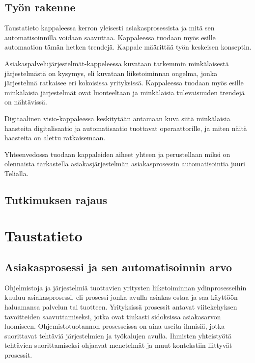 \documentclass[finnish,12pt,a4paper,pdftex]{article}
\begin{document}
\subsection{Työn rakenne}
Taustatieto kappaleessa kerron yleisesti asiakasprosessista ja mitä sen automatisoinnilla voidaan saavuttaa. Kappaleessa tuodaan myös esille automaation tämän hetken trendejä. Kappale määrittää työn keskeisen konseptin.

Asiakaspalvelujärjestelmät-kappeleessa kuvataan tarkemmin minkälaisestä järjestelmästä on kysymys, eli kuvataan liiketoiminnan ongelma, jonka järjestelmä ratkaisee eri kokoisissa yrityksissä. Kappaleessa tuodaan myös esille minkälaisia järjestelmät ovat luonteeltaan ja minkälaisia tulevaisuuden trendejä on nähtävissä.

Digitaalinen visio-kappaleessa keskitytään antamaan kuva siitä minkälaisia haasteita digitalisaatio ja automatisaatio tuottavat operaattorille, ja miten näitä haasteita on alettu ratkaisemaan.

Yhteenvedossa tuodaan kappaleiden aiheet yhteen ja perustellaan miksi on olennaista tarkastella asiakasjärjestelmän asiakasprosessin automatisointia juuri Telialla.

\subsection{Tutkimuksen rajaus}


\clearpage

\section{Taustatieto}



\subsection{Asiakasprosessi ja sen automatisoinnin arvo}

 Ohjelmistoja ja järjestelmiä tuottavien yritysten liiketoiminnan ydinprosesseihin kuuluu asiakasprosessi, eli prosessi jonka avulla asiakas ostaa ja saa käyttöön haluamansa palvelun tai tuotteen. Yrityksissä prosessit antavat viitekehyksen tavoitteiden saavuttamiseksi, jotka ovat tiukasti sidoksissa asiakasarvon luomiseen. Ohjemistotuotannon prosesseissa on aina useita ihmisiä, jotka suorittavat tehtäviä järjestelmien ja työkalujen avulla. Ihmisten yhteistyötä tehtävien suorittamiseksi ohjaavat menetelmät ja muut kontekstiin liittyvät prosessit. \citep{okaytannot}
\end{document}
